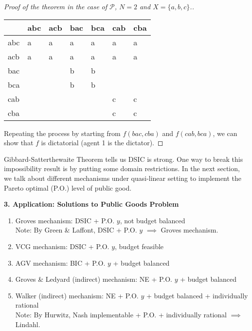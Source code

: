 \documentclass[11pt,leqno]{article}
\begin{document}
\begin{proof}[Proof of the theorem in the case of $\mathcal{P}$, $N=2$ and $X=\{a,b,c\}$.]
		\begin{table}[http]
			\centering
			\begin{tabular}{l|l|l|l|l|l|l}
				\hline & abc & acb & bac & bca & cab & cba \\
				\hline abc &a & a&a &a & a& a\\
				\hline acb & a& a& a&a &a & a\\
				\hline bac & & & b&b & & \\
				\hline bca & & & b& b& & \\
				\hline cab & & & & &c &c \\
				\hline cba & & & & &c &c \\
				\hline
			\end{tabular}
		\end{table}
		Repeating the process by starting from $f(bac,cba)$ and $f(cab,bca)$, we can show that $f$ is dictatorial (agent 1 is the dictator). 
	\end{proof}
	
	Gibbard-Satterthewaite Theorem tells us DSIC is strong. One way to break this impossibility result is by putting some domain restrictions. In the next section, we talk about different mechanisms under quasi-linear setting to implement the Pareto optimal (P.O.) level of public good. 
	
	\textbf{3. Application: Solutions to Public Goods Problem}  
	
	\begin{enumerate}
		\item Groves mechanism: DSIC + P.O. $y$, not budget balanced\\
		Note: By Green \& Laffont, DSIC + P.O. $y$ $\implies$ Groves mechanism.
		\item VCG mechanism: DSIC + P.O. $y$, budget feasible
		\item AGV mechanism: BIC + P.O. $y$ + budget balanced 
		\item Groves \& Ledyard (indirect) mechanism: NE + P.O. $y$ + budget balanced
		\item Walker (indirect) mechanism: NE + P.O. $y$ + budget balanced + individually rational\\
		Note: By Hurwitz, Nash implementable + P.O. + individually rational $\implies$ Lindahl.
	\end{enumerate}
	
	
\end{document}
